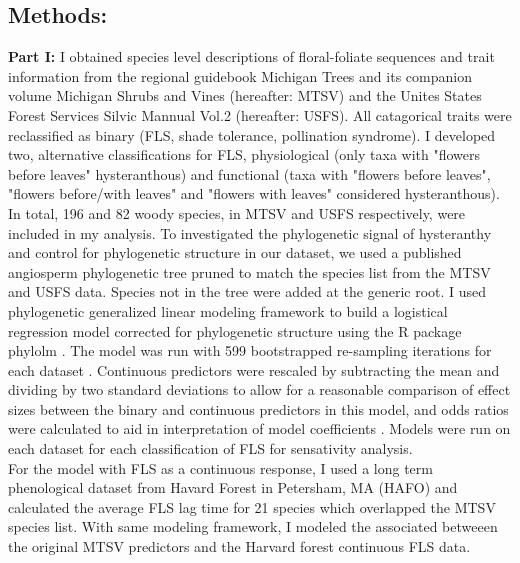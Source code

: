 \documentclass{article}\usepackage[]{graphicx}\usepackage[]{color}
\begin{document}
{\subsection*{Methods:}
\textbf{Part I:} I obtained species level descriptions of floral-foliate sequences and trait information from the regional guidebook Michigan Trees \citep{Barnes2004} and its companion volume Michigan Shrubs and Vines \citep{Barnes2016} (hereafter: MTSV) and the Unites States Forest Services Silvic Mannual Vol.2 \citep{Burns1990} (hereafter: USFS). All catagorical traits were reclassified as binary (FLS, shade tolerance, pollination syndrome). I developed two, alternative classifications for FLS, physiological (only taxa with "flowers before leaves" hysteranthous) and functional (taxa with "flowers before leaves", "flowers before/with leaves" and "flowers with leaves" considered hysteranthous). In total, 196 and 82 woody species, in MTSV and USFS respectively, were included in my analysis. To investigated the phylogenetic signal of hysteranthy and control for phylogenetic structure in our dataset, we used a published angiosperm phylogenetic tree \citep{Zanne2013} pruned to match the species list from the MTSV  and USFS data. Species not in the tree were added at the generic root. I used phylogenetic generalized linear modeling framework \citep{Ives2010} to build a logistical regression model corrected for phylogenetic structure using the R package phylolm \citep{Ho2014}. The model was run with 599 bootstrapped re-sampling iterations for each dataset \citep{Wilcox2010}. Continuous predictors were rescaled by subtracting the mean and dividing by two standard deviations to allow for a reasonable comparison of effect sizes between the binary and continuous predictors in this model, and odds ratios were calculated to aid in interpretation of model coefficients \citep{Gelman2007}. Models were run on each dataset for each classification of FLS for sensativity analysis.\\ 
\indent For the model with FLS as a continuous response, I used a long term phenological dataset from Havard Forest in Petersham, MA (HAFO) \citep{Okeefe2015} and calculated the average FLS lag time for 21 species which overlapped the MTSV species list. With same modeling framework, I modeled the associated betweeen the original MTSV predictors and the Harvard forest continuous FLS data.
}
\end{document}

